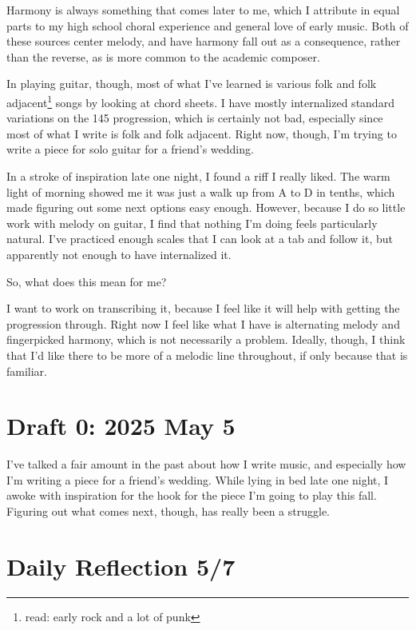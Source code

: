 \documentclass[12pt]{article}
\renewcommand{\,}{\textsuperscript{,}}
\begin{document}
Harmony is always something that comes later to me, which I attribute in equal parts to my high school choral experience and general love of early music.  
Both of these sources center melody, and have harmony fall out as a consequence, rather than the reverse, as is more common to the academic composer.

In playing guitar, though, most of what I've learned is various folk and folk adjacent\footnote{read: early rock and a lot of punk} songs by looking at chord sheets.  
I have mostly internalized standard variations on the 145 progression, which is certainly not bad, especially since most of what I write is folk and folk adjacent.  
Right now, though, I'm trying to write a piece for solo guitar for a friend's wedding.

In a stroke of inspiration late one night, I found a riff I really liked.  
The warm light of morning showed me it was just a walk up from A to D in tenths, which made figuring out some next options easy enough.  
However, because I do so little work with melody on guitar, I find that nothing I'm doing feels particularly natural.  
I've practiced enough scales that I can look at a tab and follow it, but apparently not enough to have internalized it.

So, what does this mean for me?

I want to work on transcribing it, because I feel like it will help with getting the progression through.  
Right now I feel like what I have is alternating melody and fingerpicked harmony, which is not necessarily a problem.  
Ideally, though, I think that I'd like there to be more of a melodic line throughout, if only because that is familiar.

\section{Draft 0: 2025 May 5}

I've talked a fair amount in the past about how I write music, and especially how I'm writing a piece for a friend's wedding.  
While lying in bed late one night, I awoke with inspiration for the hook for the piece I'm going to play this fall.  
Figuring out what comes next, though, has really been a struggle.

\section{Daily Reflection 5/7}
\end{document}
